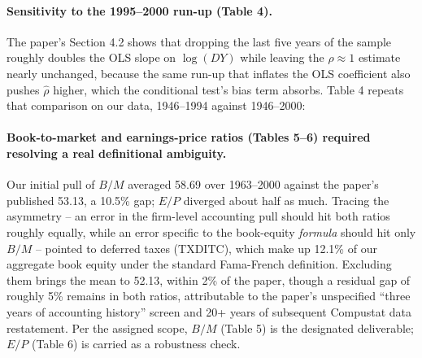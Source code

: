 \documentclass[11pt]{article}
\newcommand{\PathToOutput}{../_output}
\begin{document}
\begin{table}[H]
\centering

\caption{Table 3b (dividend yield predicts NYSE returns, 1973--2000, SIZ
panel). Compare \(\hat\rho\) against Table 3a's: the paper's argument for
why the conditional test dominates depends on both subperiods staying close
to a unit root, not just the full sample.}
\label{tab:table3b}
\end{table}

\paragraph{Sensitivity to the 1995--2000 run-up (Table 4).} The paper's
Section 4.2 shows that dropping the last five years of the sample roughly
doubles the OLS slope on \(\log(DY)\) while leaving the \(\rho \approx 1\)
estimate nearly unchanged, because the same run-up that inflates the OLS
coefficient also pushes \(\hat\rho\) higher, which the conditional test's
bias term absorbs. Table 4 repeats that comparison on our data,
1946--1994 against 1946--2000:

\begin{table}[H]
\centering

\caption{Table 4a (dividend yield predicts NYSE returns, 1946--1994, SIZ
panel, nominal returns only, per the paper).}
\label{tab:table4a}
\end{table}

\begin{table}[H]
\centering

\caption{Table 4b (dividend yield predicts NYSE returns, 1946--2000, SIZ
panel, repeated from Table 2 for direct comparison against Table 4a). The
OLS row should move noticeably between the two tables; the \(\rho \approx
1\) row should not -- that stability is the paper's point about the
conditional test absorbing the run-up through \(\hat\rho\) rather than
through the point estimate.}
\label{tab:table4b}
\end{table}

\paragraph{Book-to-market and earnings-price ratios (Tables 5--6) required
resolving a real definitional ambiguity.} Our initial pull of \(B/M\)
averaged 58.69 over 1963--2000 against the paper's published 53.13, a
10.5\% gap; \(E/P\) diverged about half as much. Tracing the asymmetry --
an error in the firm-level accounting pull should hit both ratios roughly
equally, while an error specific to the book-equity \emph{formula} should
hit only \(B/M\) -- pointed to deferred taxes (\(\text{TXDITC}\)), which
make up 12.1\% of our aggregate book equity under the standard
Fama-French definition. Excluding them brings the mean to 52.13, within
2\% of the paper, though a residual gap of roughly 5\% remains in both
ratios, attributable to the paper's unspecified ``three years of accounting
history'' screen and 20+ years of subsequent Compustat data restatement.
Per the assigned scope, \(B/M\) (Table 5) is the designated deliverable;
\(E/P\) (Table 6) is carried as a robustness check.
\end{document}
